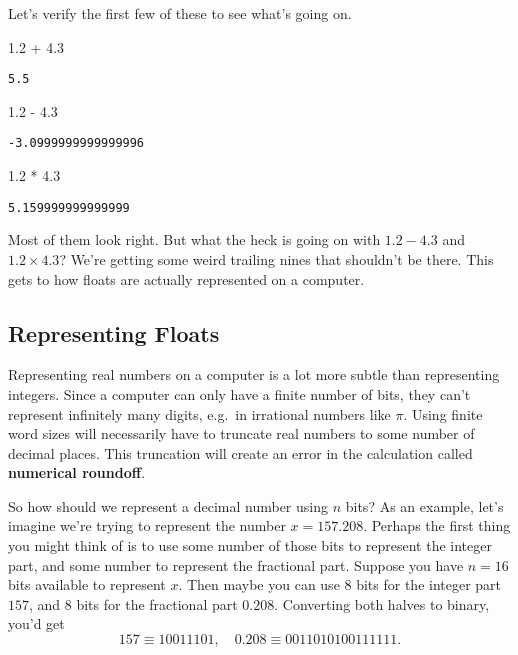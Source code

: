\documentclass[
  letterpaper,
  DIV=11,
  numbers=noendperiod]{scrreprt}
\newenvironment{Shaded}{\begin{snugshade}}{\end{snugshade}}
\newcommand{\FloatTok}[1]{\textcolor[rgb]{0.68,0.00,0.00}{#1}}
\newcommand{\OperatorTok}[1]{\textcolor[rgb]{0.37,0.37,0.37}{#1}}
\begin{document}
Let's verify the first few of these to see what's going on.

\begin{Shaded}
\begin{Highlighting}[]
\FloatTok{1.2} \OperatorTok{+} \FloatTok{4.3}
\end{Highlighting}
\end{Shaded}

\begin{verbatim}
5.5
\end{verbatim}

\begin{Shaded}
\begin{Highlighting}[]
\FloatTok{1.2} \OperatorTok{{-}} \FloatTok{4.3}
\end{Highlighting}
\end{Shaded}

\begin{verbatim}
-3.0999999999999996
\end{verbatim}

\begin{Shaded}
\begin{Highlighting}[]
\FloatTok{1.2} \OperatorTok{*} \FloatTok{4.3}
\end{Highlighting}
\end{Shaded}

\begin{verbatim}
5.159999999999999
\end{verbatim}

Most of them look right. But what the heck is going on with
\(1.2 - 4.3\) and \(1.2 \times 4.3\)? We're getting some weird trailing
nines that shouldn't be there. This gets to how floats are actually
represented on a computer.

\hypertarget{representing-floats}{%
\subsection{Representing Floats}\label{representing-floats}}

Representing real numbers on a computer is a lot more subtle than
representing integers. Since a computer can only have a finite number of
bits, they can't represent infinitely many digits, e.g.~in irrational
numbers like \(\pi\). Using finite word sizes will necessarily have to
truncate real numbers to some number of decimal places. This truncation
will create an error in the calculation called \textbf{numerical
roundoff}.

So how should we represent a decimal number using \(n\) bits? As an
example, let's imagine we're trying to represent the number
\(x=157.208\). Perhaps the first thing you might think of is to use some
number of those bits to represent the integer part, and some number to
represent the fractional part. Suppose you have \(n=16\) bits available
to represent \(x\). Then maybe you can use 8 bits for the integer part
\(157\), and 8 bits for the fractional part \(0.208\). Converting both
halves to binary, you'd get
\[157 \equiv 10011101, \quad 0.208 \equiv 0011010100111111.\]
\end{document}
